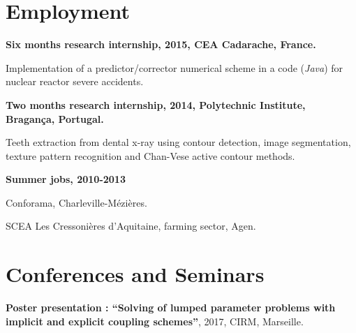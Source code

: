 \documentclass{article}
\renewenvironment{itemize}{
  \begin{list}{}{
      \setlength{\leftmargin}{1.5em}
      \setlength{\itemsep}{0.25em}
      \setlength{\parskip}{0pt}
      \setlength{\parsep}{0.25em}
    }
}{
  \end{list}
}
\begin{document}
\section*{Employment}
\begin{itemize}
	\item \textbf{Six months research internship, 2015, CEA Cadarache, France.}
		\begin{itemize}
			\item Implementation of a predictor/corrector numerical scheme in a code (\textit{Java}) for nuclear reactor severe accidents.
		\end{itemize}
	\item \textbf{Two months research internship, 2014, Polytechnic Institute, Bragança, Portugal.}
		\begin{itemize}
			\item Teeth extraction from dental x-ray using contour detection, image segmentation, texture pattern recognition and Chan-Vese active contour methods.
		\end{itemize}
	\item \textbf{Summer jobs, 2010-2013}
		\begin{itemize}
			\item Conforama, Charleville-Mézières.
			\item SCEA Les Cressonières d'Aquitaine, farming sector, Agen.
		\end{itemize}
\end{itemize}  


\section*{Conferences and Seminars}
\begin{itemize}
	\item \textbf{Poster presentation : ``Solving of lumped parameter problems with implicit and explicit coupling schemes''}, 2017, CIRM, Marseille.
\end{itemize}  
\end{document}
